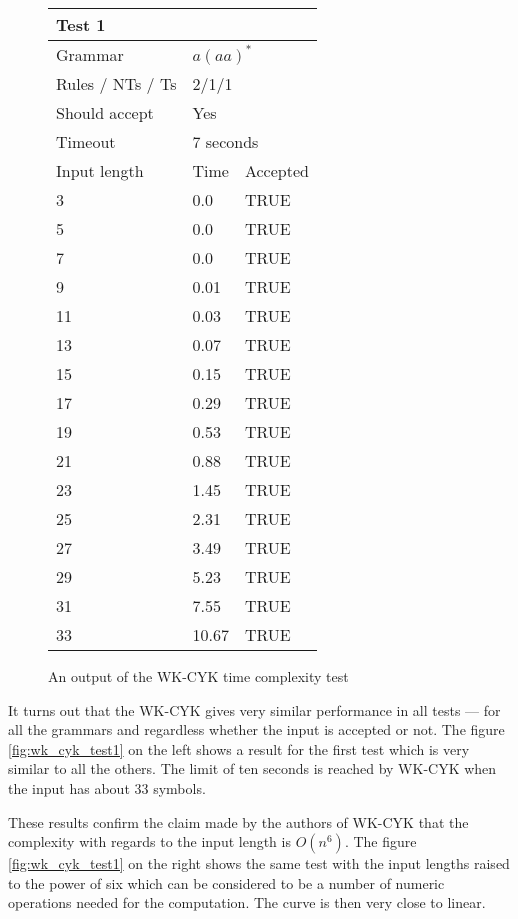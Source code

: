 \begin{figure}[h]
\centering
  \caption{An output of the WK-CYK time complexity test}
  \label{tab:wk_cyk_res}
\begin{tabular}{ |l|l|l|  }
  \hline
  \multicolumn{3}{|l|}{Test 1} \\
  \hline
  Grammar & \multicolumn{2}{|l|}{$a(aa)^*$} \\
  Rules / NTs / Ts & \multicolumn{2}{|l|}{2/1/1} \\
  Should accept & \multicolumn{2}{|l|}{Yes} \\
  Timeout & \multicolumn{2}{|l|}{7 seconds} \\
  \hline
  Input length & Time & Accepted \\
  \hline
  3 & 0.0 & TRUE \\
  5 & 0.0 & TRUE \\
  7 & 0.0 & TRUE \\
  9 & 0.01 & TRUE \\
  11 & 0.03 &  TRUE \\
  13 & 0.07 &  TRUE \\
  15 & 0.15 &  TRUE \\
  17 & 0.29 &  TRUE \\
  19 & 0.53 &  TRUE \\
  21 & 0.88 &  TRUE \\
  23 & 1.45 &  TRUE \\
  25 & 2.31 &  TRUE \\
  27 & 3.49 &  TRUE \\
  29 & 5.23 & TRUE \\
  31 & 7.55 & TRUE \\
  33 & 10.67 & TRUE \\

  \hline
\end{tabular}
\end{figure}

It turns out that the WK-CYK gives very similar performance in all tests --- for all the grammars and regardless whether the input is accepted or not. The figure \ref{fig:wk_cyk_test1} on the left shows a result for the first test which is very similar to all the others. The limit of ten seconds is reached by WK-CYK when the input has about 33 symbols.

These results confirm the claim made by the authors of WK-CYK that the complexity with regards to the input length is $O(n^6)$. The figure \ref{fig:wk_cyk_test1} on the right shows the same test with the input lengths raised to the power of six which can be considered to be a number of numeric operations needed for the computation. The curve is then very close to linear.

